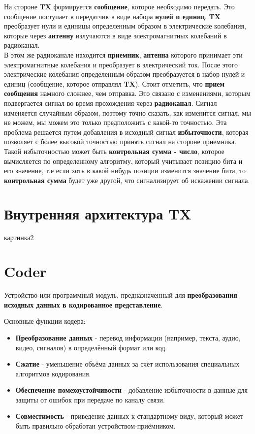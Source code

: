 На стороне \textbf{TX} формируется \textbf{сообщение}, которое необходимо передать. Это сообщение поступает в передатчик в виде набора \textbf{нулей и единиц}. \textbf{TX} преобразует нули и единицы определенным образом в электрические колебания, которые через \textbf{антенну} излучаются в виде электромагнитных колебаний в радиоканал.\\
В этом же радиоканале находится \textbf{приемник}, \textbf{антенна} которого принимает эти электромагнитные колебания и преобразует в электрический ток. После этого электрические колебания определенным образом преобразуется в набор нулей и единиц (сообщение, которое отправлял \textbf{TX}). Стоит отметить, что \textbf{прием сообщения} намного сложнее, чем отправка. Это связано с изменениями, которым подвергается сигнал во время прохождения через \textbf{радиоканал}. Сигнал изменяется случайным образом, поэтому точно сказать, как изменится сигнал, мы не можем, мы можем это только предположить с какой-то точностью. Эта проблема решается путем добавления в исходный сигнал \textbf{избыточности}, которая позволяет с более высокой точностью принять сигнал на стороне приемника. Такой избыточностью может быть \textbf{контрольная сумма - число}, которое вычисляется по определенному алгоритму, который учитывает позицию бита и его значение, т.е если хоть в какой нибудь позиции изменится значение бита, то \textbf{контрольная сумма} будет уже другой, что сигнализирует об искажении сигнала.

\section*{Внутренняя архитектура TX}

картинка2 \\

\section*{Coder}

Устройство или программный модуль, предназначенный для \textbf{преобразования исходных данных в кодированное представление}. 

\medskip

Основные функции кодера:
\begin{itemize}
    \item \textbf{Преобразование данных} - перевод информации (например, текста, аудио, видео, сигналов) в определённый формат или код.
    \item \textbf{Сжатие} - уменьшение объёма данных за счёт использования специальных алгоритмов кодирования.
    \item \textbf{Обеспечение помехоустойчивости} - добавление избыточности в данные для защиты от ошибок при передаче по каналу связи.
    \item \textbf{Совместимость} - приведение данных к стандартному виду, который может быть правильно обработан устройством-приёмником.
\end{itemize}

